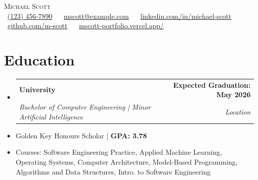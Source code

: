 \documentclass[letterpaper,11pt]{article}
\makeatletter
\newcommand{\faPhone}{}
\newcommand{\faEnvelope}{}
\newcommand{\faLinkedin}{}
\newcommand{\faGithub}{}
\newcommand{\faBriefcase}{}
\newcommand{\resumeItem}[1]{
  \item\small{
    {#1 \vspace{0pt}}
  }
}
\newcommand{\resumeSubheading}[4]{
  \vspace{-2pt}\item
    \begin{tabular*}{1.0\textwidth}[t]{l@{\extracolsep{\fill}}r}
      \textbf{#1} & \textbf{\small #2} \\
      \textit{\small#3} & \textit{\small #4} \\
    \end{tabular*}\vspace{-7pt}
}
\newcommand{\resumeSubHeadingListStart}{\begin{itemize}[leftmargin=0.0in, label={}]}
\newcommand{\resumeSubHeadingListEnd}{\end{itemize}}\vspace{0pt}
\newcommand{\resumeItemListStart}{\begin{itemize}}
\newcommand{\resumeItemListEnd}{\end{itemize}\vspace{-5pt}}
\makeatother
\begin{document}
\begin{center}
    {\Large \scshape Michael Scott} \\[2mm]
    \footnotesize \raisebox{-0.1\height}
    \faPhone\ \underline{(123) 456-7890} ~ 
    {\faEnvelope\  \underline{mscott@example.com}} ~ 
    {\faLinkedin\ \underline{\href{https://www.linkedin.com/in/michael-scott/}{linkedin.com/in/michael-scott}}}  ~
    {\faGithub\ \underline{\href{https://github.com/m-scott}{github.com/m-scott}}} ~
    {\faBriefcase\ \underline{\href{https://mscott-portfolio.vercel.app/}{mscott-portfolio.vercel.app/}}}
    \vspace{-8pt}
\end{center}

\section{Education}
  \resumeSubHeadingListStart
    \resumeSubheading
      {University}{Expected Graduation: May 2026}
      {Bachelor of Computer Engineering | Minor Artificial Intelligence
      }{Location}
  \resumeSubHeadingListEnd
    \resumeItemListStart
        \resumeItem {Golden Key Honours Scholar | \textbf{GPA: 3.78}}
        \vspace{-7pt}
        \resumeItem {Courses: Software Engineering Practice, Applied Machine Learning, Operating Systems, Computer Architecture, Model-Based Programming, Algorithms and Data Structures, Intro. to Software Engineering}
    \resumeItemListEnd
    \vspace{-12pt}
\end{document}
